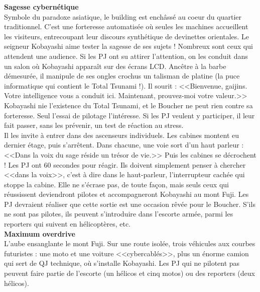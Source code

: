 \documentclass[11pt,twoside,a4paper]{book}
\begin{document}
\textbf{\large Sagesse cybern{\'e}tique}~\\

Symbole du paradoxe asiatique, le building est ench{\^a}ss{\'e} au coeur du quartier traditionnel. C'est une forteresse automatis{\'e}e o{\`u} seules les machines accueillent les visiteurs, entrecoupant leur discours synth{\'e}tique de devinettes orientales. Le seigneur Kobayashi aime tester la sagesse de ses sujets ! Nombreux sont ceux qui attendent une audience. Si les PJ ont su attirer l'attention, on les conduit dans un salon o{\`u} Kobayashi appara{\^i}t sur des {\'e}crans LCD. Anc{\^e}tre {\`a} la barbe d{\'e}mesur{\'e}e, il manipule de ses ongles crochus un talisman de platine (la puce informatique qui contient le Total Tsunami !). Il sourit : <<Bienvenue, gaijins. Votre intelligence vous a conduit ici. Maintenant, prouvez-moi votre valeur.>> Kobayashi nie l'existence du Total Tsunami, et le Boucher ne peut rien contre sa forteresse. Seul l'essai de pilotage l'int{\'e}resse. Si les PJ veulent y participer, il leur fait passer, sans les pr{\'e}venir, un test de r{\'e}action au stress.~\\

Il les invite {\`a} entrer dans des ascenseurs individuels. Les cabines montent eu dernier {\'e}tage, puis s'arr{\^e}tent. Dans chacune, une voie sort d'un haut parleur : <<Dans la voix du sage r{\'e}side un tr{\'e}sor de vie.>> Puis les cabines se d{\'e}crochent ! Les PJ ont 60 secondes pour r{\'e}agir. Ils doivent simplement penser {\`a} chercher <<dans la voix>>, c'est {\`a} dire dans le haut-parleur, l'interrupteur cach{\'e}e qui stoppe la cabine. Elle ne s'{\'e}crase pas, de toute fa\c{c}on, mais seuls ceux qui r{\'e}ussissent deviendront pilotes et accompagneront Kobayashi au mont Fuji. Les PJ devraient r{\'e}aliser que cette sortie est une occasion r{\^e}v{\'e}e pour le Boucher. S'ils ne sont pas pilotes, ils peuvent s'introduire dans l'escorte arm{\'e}e, parmi les reporters qui suivent en h{\'e}licopt{\`e}res, etc.~\\

\textbf{\large Maximum overdrive}~\\

L'aube ensanglante le mont Fuji. Sur une route isol{\'e}e, trois v{\'e}hicules aux courbes futuristes : une moto et une voiture <<cybercabl{\'e}s>>, plus un {\'e}norme camion qui sert de QJ technique, o{\`u} s'installe Kobayashi. Les PJ qui ne pilotent pas peuvent faire partie de l'escorte (un h{\'e}licos et cinq motos) ou des reporters (deux h{\'e}licos).~\\
\end{document}
